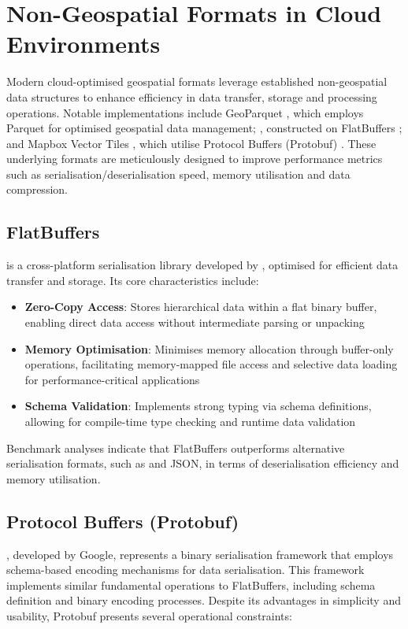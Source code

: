 \section{Non-Geospatial Formats in Cloud Environments}
\label{rw:non_geospatial_formats}
Modern cloud-optimised geospatial formats leverage established non-geospatial data structures to enhance efficiency in data transfer, storage and processing operations. Notable implementations include GeoParquet \citep{geoparquet}, which employs Parquet \citep{parquet} for optimised geospatial data management; \citet{flatgeobuf}, constructed on FlatBuffers \citep{flatbuffers}; and Mapbox Vector Tiles \citep{mapbox-vector-tiles}, which utilise Protocol Buffers (Protobuf) \citep{protobuf}. These underlying formats are meticulously designed to improve performance metrics such as serialisation/deserialisation speed, memory utilisation and data compression.

\subsection{FlatBuffers}
\label{rw:non_geospatial_formats:flatbuffers}
\citet{flatbuffers} is a cross-platform serialisation library developed by \citet{google_flatbuffers}, optimised for efficient data transfer and storage. Its core characteristics include:

\begin{itemize}
  \item \textbf{Zero-Copy Access}: Stores hierarchical data within a flat binary buffer, enabling direct data access without intermediate parsing or unpacking
  \item \textbf{Memory Optimisation}: Minimises memory allocation through buffer-only operations, facilitating memory-mapped file access and selective data loading for performance-critical applications
  \item \textbf{Schema Validation}: Implements strong typing via schema definitions, allowing for compile-time type checking and runtime data validation
\end{itemize}

Benchmark analyses \citep{flatbuffers_benchmark} indicate that FlatBuffers outperforms alternative serialisation formats, such as \citet{protobuf} and JSON, in terms of deserialisation efficiency and memory utilisation.

\subsection{Protocol Buffers (Protobuf)}
\label{rw:non_geospatial_formats:protobuf}
\citet{protobuf}, developed by Google, represents a binary serialisation framework that employs schema-based encoding mechanisms for data serialisation. This framework implements similar fundamental operations to FlatBuffers, including schema definition and binary encoding processes.
Despite its advantages in simplicity and usability, Protobuf presents several operational constraints:

